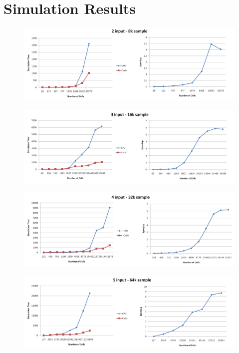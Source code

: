 \section*{Simulation Results}\label{sec:sim_res}
\begin{figure}[h!]
\centering
\includegraphics[scale=0.3]{img/compleate1.png}
\label{img:result1}
\label{Result of the 2 input simulation}
\end{figure}

\begin{figure}[h!]
\centering
\includegraphics[scale=0.3]{img/compleate2.png}
\label{img:result2}
\label{Result of the 3 input simulation}
\end{figure}

\begin{figure}[h!]
\centering
\includegraphics[scale=0.3]{img/compleate3.png}
\label{img:result3}
\label{Result of the 4 input simulation}
\end{figure}

\begin{figure}[h!]
\centering
\includegraphics[scale=0.3]{img/compleate4.png}
\label{img:result4}
\label{Result of the 5 input simulation}
\end{figure}

